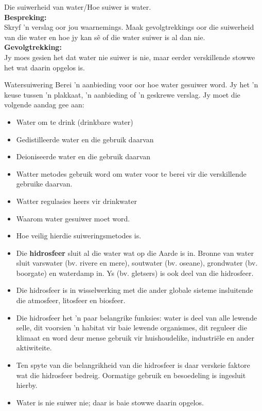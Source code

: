 \begin{g_experiment}{Die suiwerheid van water/Hoe suiwer is water.}
\\
\label{m38138*id3429827}\noindent{}\textbf{Bespreking:}\\
Skryf  'n verslag oor jou waarnemings. Maak gevolgtrekkings oor die suiwerheid van die water en hoe jy kan sê of die water suiwer is al dan nie.
\\  
\label{m38138*id68921}\noindent{}\textbf{Gevolgtrekking:}\\
Jy moes gesien het dat water nie suiwer is nie, maar eerder verskillende stowwe het wat daarin opgelos is.
\\
\end{g_experiment}
\label{m38138*id672214}
            \begin{project}{Watersuiwering}
            \nopagebreak
\label{m38138*id97324}
Berei  'n aanbieding voor oor hoe water gesuiwer word. Jy het  'n keuse tussen  'n plakkaat,  'n aanbieding of  'n geskrewe verslag. Jy moet die volgende aandag gee aan:
\label{m38138*id097324}\begin{itemize}[noitemsep]
            \item Water om te drink (drinkbare water)
\item Gedistilleerde water en die gebruik daarvan
\item Deioniseerde water en die gebruik daarvan
\item Watter metodes gebruik word om water voor te berei vir die verskillende gebruike daarvan.
\item Watter regulasies heers vir drinkwater
\item Waarom water gesuiwer moet word.
\item Hoe veilig hierdie suiweringsmetodes is.
\end{itemize}
\par 
\end{project}


            \nopagebreak

\begin{itemize}[noitemsep]
\item Die \textbf{hidrosfeer} sluit al die water wat op die Aarde is in. Bronne van water sluit varswater (bv. rivere en mere), soutwater (bv. oseane), grondwater (bv. boorgate) en waterdamp in. Ys (bv. gletsers)  is ook deel van die hidrosfeer.
\label{m38138*uid93}\item Die hidrosfeer is in wisselwerking met die ander globale sisteme insluitende die atmosfeer, litosfeer en biosfeer.
\label{m38138*uid94}\item Die hidrosfeer het  'n paar belangrike funksies: water is deel van alle lewende selle, dit voorsien  'n habitat vir baie lewende organismes, dit reguleer die klimaat  en word deur mense gebruik  vir huishoudelike, industriële en ander aktiwiteite.
\label{m38138*uid106}\item Ten spyte van die belangrikheid van die hidrosfeer is daar verskeie faktore wat die hidrosfeer bedreig. Oormatige gebruik en besoedeling is ingesluit hierby.
\item Water is nie suiwer nie; daar is baie stowwe daarin opgelos.
\end{itemize}


